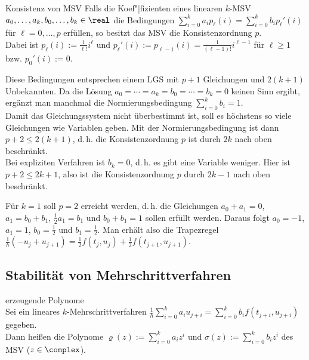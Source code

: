 \begin{Satz}{Konsistenz von MSV}
    Falls die Koef"|fizienten eines linearen $k$-MSV\\
    $a_0, \dotsc, a_k, b_0, \dotsc, b_k \in \real$ die Bedingungen
    $\sum_{i=0}^k a_i p_\ell(i) = \sum_{i=0}^k b_i p_\ell'(i)$ für
    $\ell = 0, \dotsc, p$ erfüllen,
    so besitzt das MSV die Konsistenzordnung $p$.\\
    Dabei ist $p_\ell(i) := \frac{1}{\ell!} i^\ell$ und
    $p_\ell'(i) := p_{\ell-1}(i) = \frac{1}{(\ell - 1)!} i^{\ell - 1}$
    für $\ell \ge 1$ bzw. $p_0'(i) := 0$.
\end{Satz}

\begin{Bem}
    Diese Bedingungen entsprechen einem LGS mit $p + 1$ Gleichungen und
    $2(k + 1)$ Unbekannten.
    Da die Lösung $a_0 = \dotsb = a_k = b_0 = \dotsb = b_k = 0$
    keinen Sinn ergibt,
    ergänzt man manchmal die Normierungsbedingung $\sum_{i=0}^k b_i = 1$.\\
    Damit das Gleichungssystem nicht überbestimmt ist, soll es höchstens so
    viele Gleichungen wie Variablen geben.
    Mit der Normierungsbedingung ist dann $p + 2 \le 2(k + 1)$, d.\,h.
    die Konsistenzordnung $p$ ist durch $2k$ nach oben beschränkt.\\
    Bei expliziten Verfahren ist $b_k = 0$, d.\,h. es gibt eine Variable
    weniger.
    Hier ist $p + 2 \le 2k + 1$, also ist die Konsistenzordnung $p$
    durch $2k - 1$ nach oben beschränkt.
\end{Bem}

\begin{Bsp}
    Für $k = 1$ soll $p = 2$ erreicht werden, d.\,h. die Gleichungen
    $a_0 + a_1 = 0$, $a_1 = b_0 + b_1$, $\frac{1}{2} a_1 = b_1$ und
    $b_0 + b_1 = 1$ sollen erfüllt werden.
    Daraus folgt $a_0 = -1$, $a_1 = 1$, $b_0 = \frac{1}{2}$ und
    $b_1 = \frac{1}{2}$.
    Man erhält also die Trapezregel
    $\frac{1}{h} (-u_j + u_{j+1}) = \frac{1}{2} f(t_j, u_j) +
    \frac{1}{2} f(t_{j+1}, u_{j+1})$.
\end{Bsp}

\pagebreak

\subsection{%
    Stabilität von Mehrschrittverfahren%
}

\begin{Def}{erzeugende Polynome}\\
    Sei ein lineares $k$-Mehrschrittverfahren
    $\frac{1}{h} \sum_{i=0}^k a_i u_{j+i} =
    \sum_{i=0}^k b_i f(t_{j+i}, u_{j+i})$
    gegeben.\\
    Dann heißen die Polynome
    $\varrho(z) := \sum_{i=0}^k a_i z^i$ und
    $\sigma(z) := \sum_{i=0}^k b_i z^i$
     des MSV
    ($z \in \complex$).
\end{Def}


